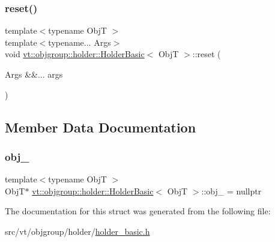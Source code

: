 \subsubsection{\texorpdfstring{reset()}{reset()}}
{\footnotesize\ttfamily template$<$typename ObjT $>$ \\
template$<$typename... Args$>$ \\
void \hyperlink{structvt_1_1objgroup_1_1holder_1_1_holder_basic}{vt\+::objgroup\+::holder\+::\+Holder\+Basic}$<$ ObjT $>$\+::reset (\begin{DoxyParamCaption}\item[{Args \&\&...}]{args }\end{DoxyParamCaption})\hspace{0.3cm}{\ttfamily [inline]}}



\subsection{Member Data Documentation}
\mbox{\label{structvt_1_1objgroup_1_1holder_1_1_holder_basic_a2313dfbdc994c52b649ee2fc666f1219}} 
\subsubsection{\texorpdfstring{obj\+\_\+}{obj\_}}
{\footnotesize\ttfamily template$<$typename ObjT $>$ \\
ObjT$\ast$ \hyperlink{structvt_1_1objgroup_1_1holder_1_1_holder_basic}{vt\+::objgroup\+::holder\+::\+Holder\+Basic}$<$ ObjT $>$\+::obj\+\_\+ = nullptr\hspace{0.3cm}{\ttfamily [private]}}



The documentation for this struct was generated from the following file\+:\begin{DoxyCompactItemize}
\item 
src/vt/objgroup/holder/\hyperlink{holder__basic_8h}{holder\+\_\+basic.\+h}\end{DoxyCompactItemize}
